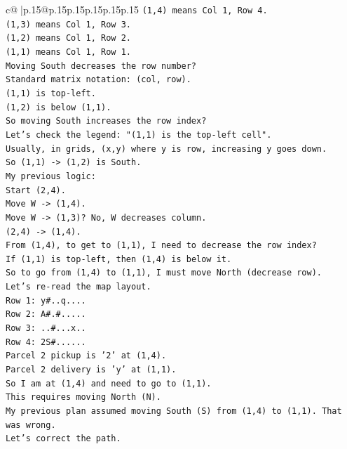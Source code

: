 \documentclass{article}
\begin{document}
{\begin{supertabular}{c@{$\;$}|p{.15\linewidth}@{}p{.15\linewidth}p{.15\linewidth}p{.15\linewidth}p{.15\linewidth}p{.15\linewidth}}
{{{\texttt{(1,4) means Col 1, Row 4.} \\
\texttt{(1,3) means Col 1, Row 3.} \\
\texttt{(1,2) means Col 1, Row 2.} \\
\texttt{(1,1) means Col 1, Row 1.} \\
\texttt{Moving South decreases the row number?} \\
\texttt{Standard matrix notation: (col, row).} \\
\texttt{(1,1) is top{-}left.} \\
\texttt{(1,2) is below (1,1).} \\
\texttt{So moving South increases the row index?} \\
\texttt{Let's check the legend: "(1,1) is the top{-}left cell".} \\
\texttt{Usually, in grids, (x,y) where y is row, increasing y goes down.} \\
\texttt{So (1,1) {-}> (1,2) is South.} \\
\texttt{My previous logic:} \\
\texttt{Start (2,4).} \\
\texttt{Move W {-}> (1,4).} \\
\texttt{Move W {-}> (1,3)? No, W decreases column.} \\
\texttt{(2,4) {-}> (1,4).} \\
\texttt{From (1,4), to get to (1,1), I need to decrease the row index?} \\
\texttt{If (1,1) is top{-}left, then (1,4) is below it.} \\
\texttt{So to go from (1,4) to (1,1), I must move North (decrease row).} \\
\texttt{Let's re{-}read the map layout.} \\
\texttt{Row 1: y\#..q....} \\
\texttt{Row 2: A\#.\#.....} \\
\texttt{Row 3: ..\#...x..} \\
\texttt{Row 4: 2S\#......} \\
\texttt{Parcel 2 pickup is '2' at (1,4).} \\
\texttt{Parcel 2 delivery is 'y' at (1,1).} \\
\texttt{So I am at (1,4) and need to go to (1,1).} \\
\texttt{This requires moving North (N).} \\
\texttt{My previous plan assumed moving South (S) from (1,4) to (1,1). That was wrong.} \\
\texttt{Let's correct the path.} \\
}}}
\end{supertabular}}
\end{document}
